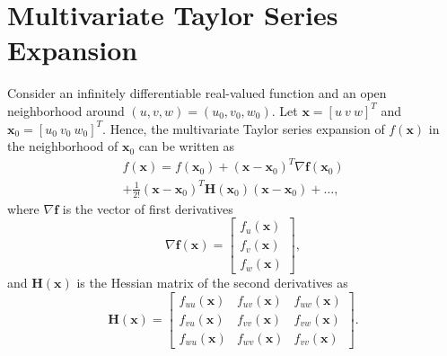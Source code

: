 \documentclass{ieeeaccess}
\begin{document}
\section{Multivariate Taylor Series Expansion}
\label{app:taylor_series}
Consider an infinitely differentiable real-valued function and an open neighborhood around $(u,v,w) = (u_0,v_0,w_0)$. Let $\mathbf{x} = [u \ v \ w]^T$ and $\mathbf{x}_0 = [u_0 \ v_0 \ w_0]^T$. Hence, the multivariate Taylor series expansion of $f(\mathbf{x})$ in the neighborhood of $\mathbf{x}_0$ can be written as
\begin{multline}
\label{eq:taylor_series}
    f(\mathbf{x}) = f(\mathbf{x}_0) + (\mathbf{x}-\mathbf{x}_0)^T \nabla \mathbf{f}(\mathbf{x}_0) \\
    + \frac{1}{2!}(\mathbf{x}-\mathbf{x}_0)^T \mathbf{H}(\mathbf{x}_0) (\mathbf{x}-\mathbf{x}_0) + \dots ,
\end{multline}
where $\nabla \mathbf{f}$ is the vector of first derivatives
\begin{equation}
    \nabla \mathbf{f}(\mathbf{x}) = 
    \begin{bmatrix}
    f_u(\mathbf{x}) \\
    f_v(\mathbf{x}) \\
    f_w(\mathbf{x})
    \end{bmatrix},
\end{equation}
and $\mathbf{H(x)}$ is the Hessian matrix of the second derivatives as
\begin{equation}
    \mathbf{H(x)} = 
    \begin{bmatrix}
    f_{uu}(\mathbf{x}) & f_{uv}(\mathbf{x}) & f_{uw}(\mathbf{x}) \\
    f_{vu}(\mathbf{x}) & f_{vv}(\mathbf{x}) & f_{vw}(\mathbf{x}) \\
    f_{wu}(\mathbf{x}) & f_{wv}(\mathbf{x}) & f_{vv}(\mathbf{x}) 
    \end{bmatrix}.
\end{equation}
\end{document}
